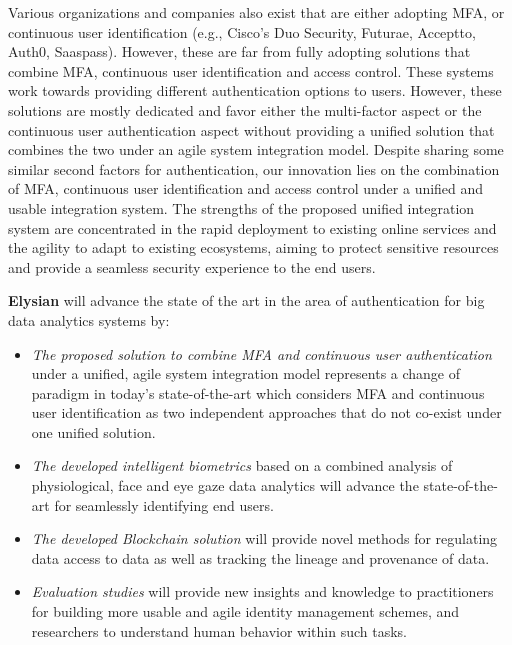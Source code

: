 \documentclass[a4paper,11pt]{article}
\newcommand{\project}[1]{\textbf{#1}\xspace}
\newcommand{\SECURITY}{\project{Elysian}}
\newcommand{\TheProject}{\SECURITY}
\begin{document}
Various organizations and companies also exist that are either adopting MFA, or continuous user identification (e.g., Cisco’s Duo Security, Futurae, Acceptto, Auth0, Saaspass). However, these are far from fully adopting solutions that combine MFA, continuous user identification and access control. These systems work towards providing different authentication options to users. However, these solutions are mostly dedicated and favor either the multi-factor aspect or the continuous user authentication aspect without providing a unified solution that combines the two under an agile system integration model. Despite sharing some similar second factors for authentication, our innovation lies on the combination of MFA, continuous user identification and access control under a unified and usable integration system. The strengths of the proposed unified integration system are concentrated in the rapid deployment to existing online services and the agility to adapt to existing ecosystems, aiming to protect sensitive resources and provide a seamless security experience to the end users.

\begin{mdframed}[backgroundcolor=gray!10]
\TheProject{} will advance the state of the art in the area of authentication for big data analytics systems by:
\begin{itemize}
\item \emph{The proposed solution to combine MFA and continuous user authentication} under a unified, agile system integration model represents a change of paradigm in today’s state-of-the-art which considers MFA and continuous user identification as two independent approaches that do not co-exist under one unified solution.
\item \emph{The developed intelligent biometrics} based on a combined analysis of physiological, face and eye gaze data analytics will advance the state-of-the-art for seamlessly identifying end users.
\item \emph{The developed Blockchain solution} will provide novel methods for regulating data access to data as well as tracking the lineage and provenance of data. 
\item \emph{Evaluation studies} will provide new insights and knowledge to practitioners for building more usable and agile identity management schemes, and researchers to understand human behavior within such tasks.
\end{itemize}
\end{mdframed}
\end{document}
